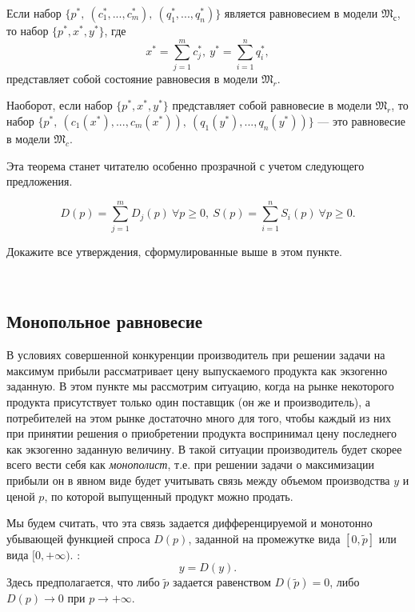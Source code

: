 \begin{teo}
    Если набор $\{p^{*}, \ (c_{1}^{*},...,c_{m}^{*}), \ (q_{1}^{*},...,q_{n}^{*})\}$
    является равновесием в модели $\mathfrak{M}_{с}$, то набор
    $\{p^{*},x^{*},y^{*}\}$, где
    \[x^{*}=\sum_{j=1}^{m}c_{j}^{*}, \ y^{*}=\sum_{i=1}^{n}q_{i}^{*},\]
    представляет собой состояние равновесия в модели
    $\mathfrak{M}_{r}$.

    Наоборот, если набор $\{p^{*},x^{*},y^{*}\}$ представляет собой
    равновесие в модели $\mathfrak{M}_{r}$, то набор
    $\{p^{*}, \ (c_{1}(x^{*}),...,c_{m}(x^{*})), \ (q_{1}(y^{*}),...,q_{n}(y^{*}))\}$
    --- это равновесие в модели $\mathfrak{M}_{c}$.
\end{teo}


    Эта теорема станет читателю особенно прозрачной с учетом
    следующего предложения.

\begin{prop}
    \[D(p)=\sum_{j=1}^{m}D_{j}(p) \ \forall p\geqslant0,
    \ S(p)=\sum_{i=1}^{n}S_{i}(p) \ \forall p\geqslant0.\]
\end{prop}

\begin{exer}
    Докажите все утверждения, сформулированные выше в этом пункте.
\end{exer}





\


\subsection{Монопольное равновесие}
    В условиях совершенной конкуренции производитель при решении
    задачи на максимум прибыли рассматривает цену выпускаемого
    продукта как экзогенно заданную. В этом пункте мы рассмотрим ситуацию,
    когда на рынке  некоторого  продукта присутствует только один
    поставщик (он же и производитель), а потребителей на этом рынке достаточно много
    для того, чтобы каждый из них при принятии решения о
    приобретении продукта воспринимал цену последнего как экзогенно
    заданную величину. В такой ситуации производитель будет скорее
    всего вести себя как \emph{монополист}, т.е. при решении задачи
    о максимизации прибыли он в явном виде будет учитывать  связь
    между объемом производства $y$ и ценой $p$, по которой выпущенный продукт
    можно продать.

    Мы будем считать, что эта связь задается дифференцируемой и
    монотонно убывающей функцией
    спроса $D(p)$, заданной на промежутке вида $[0,\tilde{p}]$  или
     вида $[0,+\infty)$. :
    \[y=D(y).\]
    Здесь предполагается, что либо $\tilde{p}$ задается равенством
    $D(\tilde{p})=0$, либо $D(p)\rightarrow 0$ при $p\rightarrow
    +\infty$.


